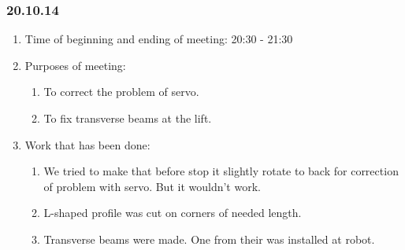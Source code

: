 	
\subsubsection{20.10.14}

\begin{enumerate}
	\item Time of beginning and ending of meeting:
	20:30 - 21:30
	\item Purposes of meeting:
	\begin{enumerate}
	  \item To correct the problem of servo.
	  
	  \item To fix transverse beams at the lift.
	  
    \end{enumerate}
    
	\item Work that has been done:
	\begin{enumerate}
	  \item We tried to make that before stop it slightly rotate to back for correction of problem with servo. But it wouldn't work.
	  
      \item L-shaped profile was cut on corners of needed length.
      
      \item Transverse beams were made. One from their was installed at robot.
      

\end{enumerate}
\end{enumerate}
